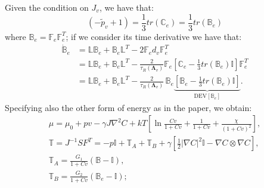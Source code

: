 \documentclass[12pt]{extarticle}
\newcommand{\F}{\ensuremath{\mathbb{F}}}
\newcommand{\LL}{\ensuremath{\mathbb{L}}}
\begin{document}
Given the condition on $J_v$, we have that:
\begin{equation}
(-\tilde{p}_v+1)=\frac{1}{3}tr(\mathbb{C}_e)=\frac{1}{3} tr(\mathbb{B}_e)
\end{equation}
where $\mathbb{B}_e=\F_e\F_e^T$; if we consider its time derivative we have that:
\begin{equation}
\begin{aligned}
\dot{\mathbb{B}}_e &= \LL \mathbb{B}_e + \mathbb{B}_e \LL^T - 2 \F_e d_v \F_e^{T} \\
&= \LL\mathbb{B}_e + \mathbb{B}_e \LL^T - \frac{2}{\tau_R(\boldsymbol{\Lambda}_v)} \F_e\left[\mathbb{C}_e-\frac{1}{3}tr(\mathbb{B}_e)\mathbb{I}\right]\F_e^T\\
&= \LL\mathbb{B}_e + \mathbb{B}_e \LL^T - \frac{2}{\tau_R(\boldsymbol{\Lambda}_v)} \,\mathbb{B}_e\underbrace{\left[\mathbb{B}_e-\frac{1}{3}tr(\mathbb{B}_e)\mathbb{I}\right]}_{\text{DEV}[\mathbb{B}_e]}.
\end{aligned}
\end{equation}
Specifying also the other form of energy as in the paper, we obtain:
\begin{equation}
\begin{aligned}
\mu = \mu_0 + p v - \gamma J\nabla^2 C + kT\left[\ln \frac{Cv}{1+Cv} + \frac{1}{1+Cv} +\frac{\chi}{(1+Cv)^2}\right],\\
\mathbb{T} = J^{-1} SF^T = -p \mathbb{I} +\mathbb{T}_A +\mathbb{T}_B + \gamma\left[\frac{1}{2} |\nabla C|^2\mathbb{I}-\nabla C \otimes \nabla C\right],\\
\mathbb{T}_A=\frac{G_1}{1+Cv}(\mathbb{B}-\mathbb{I}),\\
\mathbb{T}_B=\frac{G_2}{1+Cv}(\mathbb{B}_e-\mathbb{I});
\end{aligned} 
\end{equation}
\end{document}
